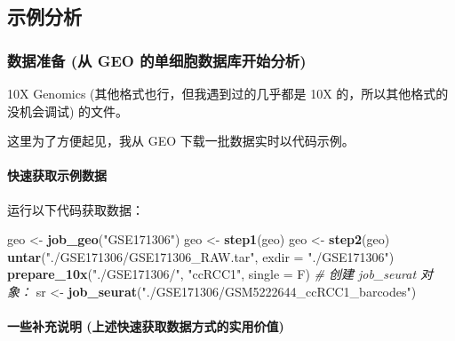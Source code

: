 \documentclass[
]{article}
\newenvironment{Shaded}{\begin{snugshade}}{\end{snugshade}}
\newcommand{\CommentTok}[1]{\textcolor[rgb]{0.56,0.35,0.01}{\textit{#1}}}
\newcommand{\DataTypeTok}[1]{\textcolor[rgb]{0.13,0.29,0.53}{#1}}
\newcommand{\KeywordTok}[1]{\textcolor[rgb]{0.13,0.29,0.53}{\textbf{#1}}}
\newcommand{\NormalTok}[1]{#1}
\newcommand{\StringTok}[1]{\textcolor[rgb]{0.31,0.60,0.02}{#1}}
\begin{document}
\hypertarget{ux793aux4f8bux5206ux6790}{%
\subsection{示例分析}\label{ux793aux4f8bux5206ux6790}}

\hypertarget{ux6570ux636eux51c6ux5907-ux4ece-geo-ux7684ux5355ux7ec6ux80deux6570ux636eux5e93ux5f00ux59cbux5206ux6790}{%
\subsubsection{数据准备 (从 GEO 的单细胞数据库开始分析)}\label{ux6570ux636eux51c6ux5907-ux4ece-geo-ux7684ux5355ux7ec6ux80deux6570ux636eux5e93ux5f00ux59cbux5206ux6790}}

10X Genomics (其他格式也行，但我遇到过的几乎都是 10X 的，所以其他格式的没机会调试) 的文件。

这里为了方便起见，我从 GEO 下载一批数据实时以代码示例。

\hypertarget{obtain}{%
\paragraph{快速获取示例数据}\label{obtain}}

运行以下代码获取数据：

\begin{Shaded}
\begin{Highlighting}[]
\NormalTok{geo \textless{}{-}}\StringTok{ }\KeywordTok{job\_geo}\NormalTok{(}\StringTok{"GSE171306"}\NormalTok{)}
\NormalTok{geo \textless{}{-}}\StringTok{ }\KeywordTok{step1}\NormalTok{(geo)}
\NormalTok{geo \textless{}{-}}\StringTok{ }\KeywordTok{step2}\NormalTok{(geo)}
\KeywordTok{untar}\NormalTok{(}\StringTok{"./GSE171306/GSE171306\_RAW.tar"}\NormalTok{, }\DataTypeTok{exdir =} \StringTok{"./GSE171306"}\NormalTok{)}
\KeywordTok{prepare\_10x}\NormalTok{(}\StringTok{"./GSE171306/"}\NormalTok{, }\StringTok{"ccRCC1"}\NormalTok{, }\DataTypeTok{single =}\NormalTok{ F)}
\CommentTok{\# 创建 job\_seurat 对象：}
\NormalTok{sr \textless{}{-}}\StringTok{ }\KeywordTok{job\_seurat}\NormalTok{(}\StringTok{"./GSE171306/GSM5222644\_ccRCC1\_barcodes"}\NormalTok{)}
\end{Highlighting}
\end{Shaded}

\hypertarget{ux4e00ux4e9bux8865ux5145ux8bf4ux660e-ux4e0aux8ff0ux5febux901fux83b7ux53d6ux6570ux636eux65b9ux5f0fux7684ux5b9eux7528ux4ef7ux503c}{%
\paragraph{一些补充说明 (上述快速获取数据方式的实用价值)}\label{ux4e00ux4e9bux8865ux5145ux8bf4ux660e-ux4e0aux8ff0ux5febux901fux83b7ux53d6ux6570ux636eux65b9ux5f0fux7684ux5b9eux7528ux4ef7ux503c}}
\end{document}
